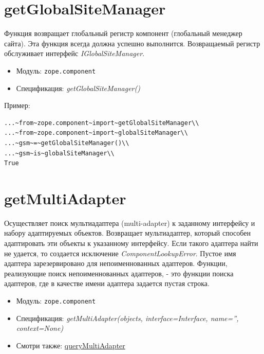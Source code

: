 \documentclass[a4paper,openany,twoside,draft]{book}
\providecommand*{\DUroletitlereference}[1]{\textsl{#1}}
\begin{document}
\section*{getGlobalSiteManager%
  \label{getglobalsitemanager}%
}

Функция возвращает глобальный регистр компонент (глобальный менеджер
сайта).  Эта функция всегда должна успешно выполнится.  Возвращаемый
регистр обслуживает интерфейс \DUroletitlereference{IGlobalSiteManager}.

\begin{itemize}

\item Модуль: \texttt{zope.component}

\item Спецификация: \DUroletitlereference{getGlobalSiteManager()}

\end{itemize}

Пример:

\begin{verbatim}
...~from~zope.component~import~getGlobalSiteManager\\
...~from~zope.component~import~globalSiteManager\\
...~gsm~=~getGlobalSiteManager()\\
...~gsm~is~globalSiteManager\\
True
\end{verbatim}


\section*{getMultiAdapter%
  \label{getmultiadapter}%
}

Осуществляет поиск мультиадаптера (multi-adapter) к заданному
интерфейсу и набору адаптируемых объектов.  Возвращает мультиадаптер,
который способен адаптировать эти объекты к указанному интерфейсу.
Если такого адаптера найти не удается, то создается исключение
\DUroletitlereference{ComponentLookupError}.  Пустое имя адаптера зарезервировано для
непоименнованных адаптеров.  Функции, реализующие поиск
непоименнованных адаптеров, - это функции поиска адаптеров, где в
качестве имени адаптера задается пустая строка.

\begin{itemize}

\item Модуль: \texttt{zope.component}

\item Спецификация: \DUroletitlereference{getMultiAdapter(objects, interface=Interface, name='',
context=None)}

\item Смотри также: \hyperref[querymultiadapter]{queryMultiAdapter}

\end{itemize}
\end{document}
